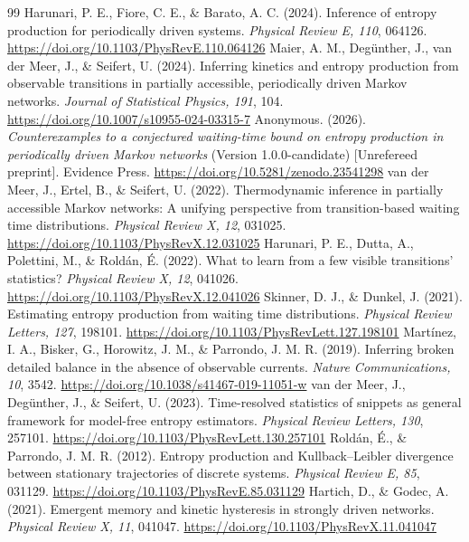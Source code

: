 \documentclass[11pt,a4paper]{article}
\begin{document}
\begin{thebibliography}{99}
 Harunari, P. E., Fiore, C. E., \& Barato, A. C. (2024). Inference of entropy production for periodically driven systems. \emph{Physical Review E, 110}, 064126. \url{https://doi.org/10.1103/PhysRevE.110.064126}
 Maier, A. M., Deg\"unther, J., van der Meer, J., \& Seifert, U. (2024). Inferring kinetics and entropy production from observable transitions in partially accessible, periodically driven Markov networks. \emph{Journal of Statistical Physics, 191}, 104. \url{https://doi.org/10.1007/s10955-024-03315-7}
 Anonymous. (2026). \emph{Counterexamples to a conjectured waiting-time bound on entropy production in periodically driven Markov networks} (Version 1.0.0-candidate) [Unrefereed preprint]. Evidence Press. \url{https://doi.org/10.5281/zenodo.23541298}
 van der Meer, J., Ertel, B., \& Seifert, U. (2022). Thermodynamic inference in partially accessible Markov networks: A unifying perspective from transition-based waiting time distributions. \emph{Physical Review X, 12}, 031025. \url{https://doi.org/10.1103/PhysRevX.12.031025}
 Harunari, P. E., Dutta, A., Polettini, M., \& Rold\'an, \'E. (2022). What to learn from a few visible transitions' statistics? \emph{Physical Review X, 12}, 041026. \url{https://doi.org/10.1103/PhysRevX.12.041026}
 Skinner, D. J., \& Dunkel, J. (2021). Estimating entropy production from waiting time distributions. \emph{Physical Review Letters, 127}, 198101. \url{https://doi.org/10.1103/PhysRevLett.127.198101}
 Mart\'inez, I. A., Bisker, G., Horowitz, J. M., \& Parrondo, J. M. R. (2019). Inferring broken detailed balance in the absence of observable currents. \emph{Nature Communications, 10}, 3542. \url{https://doi.org/10.1038/s41467-019-11051-w}
 van der Meer, J., Deg\"unther, J., \& Seifert, U. (2023). Time-resolved statistics of snippets as general framework for model-free entropy estimators. \emph{Physical Review Letters, 130}, 257101. \url{https://doi.org/10.1103/PhysRevLett.130.257101}
 Rold\'an, \'E., \& Parrondo, J. M. R. (2012). Entropy production and Kullback--Leibler divergence between stationary trajectories of discrete systems. \emph{Physical Review E, 85}, 031129. \url{https://doi.org/10.1103/PhysRevE.85.031129}
 Hartich, D., \& Godec, A. (2021). Emergent memory and kinetic hysteresis in strongly driven networks. \emph{Physical Review X, 11}, 041047. \url{https://doi.org/10.1103/PhysRevX.11.041047}

\end{thebibliography}
\end{document}
